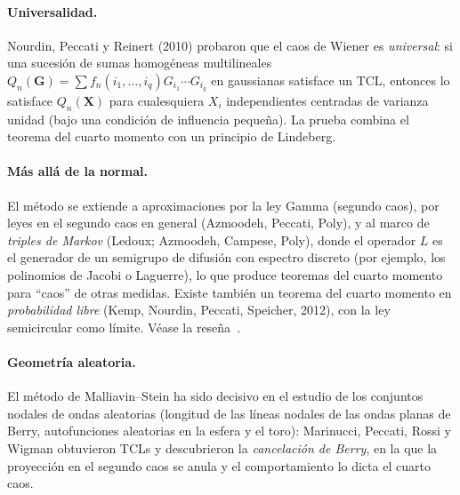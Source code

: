 \paragraph{Universalidad.} Nourdin, Peccati y Reinert (2010) probaron que el caos de Wiener es \emph{universal}:
si una sucesión de sumas homogéneas multilineales $Q_n(\mathbf G)=\sum f_n(i_1,\dots,i_q)G_{i_1}\cdots G_{i_q}$ en
gaussianas satisface un TCL, entonces lo satisface $Q_n(\mathbf X)$ para cualesquiera $X_i$ independientes
centradas de varianza unidad (bajo una condición de influencia pequeña). La prueba combina
el teorema del cuarto momento con un principio de Lindeberg.

\paragraph{Más allá de la normal.} El método se extiende a aproximaciones por la ley Gamma (segundo
caos), por leyes en el segundo caos en general (Azmoodeh, Peccati, Poly), y al marco de \emph{triples
de Markov} (Ledoux; Azmoodeh, Campese, Poly), donde el operador $L$ es el generador de un
semigrupo de difusión con espectro discreto (por ejemplo, los polinomios de Jacobi o Laguerre),
lo que produce teoremas del cuarto momento para ``caos'' de otras medidas. Existe también un
teorema del cuarto momento en \emph{probabilidad libre} (Kemp, Nourdin, Peccati, Speicher, 2012),
con la ley semicircular como límite. Véase la reseña~\cite{AzmoodehPeccatiYang21}.

\paragraph{Geometría aleatoria.} El método de Malliavin--Stein ha sido decisivo en el estudio de los
conjuntos nodales de ondas aleatorias (longitud de las líneas nodales de las ondas planas de
Berry, autofunciones aleatorias en la esfera y el toro): Marinucci, Peccati, Rossi y Wigman
obtuvieron TCLs y descubrieron la \emph{cancelación de Berry}, en la que la proyección en el segundo
caos se anula y el comportamiento lo dicta el cuarto caos.
